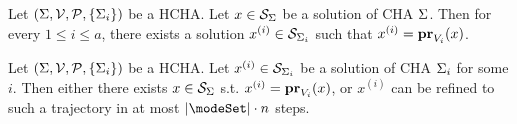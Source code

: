 \begin{thm}
	Let $(\Sys,\Vc,\Pc,\{\Sys_i\})$ be a HCHA.
	Let $x \in \Sc_\Sys$ be a solution of CHA $\Sys$.
	Then for every $1 \leq i \leq a$, 
	there exists a solution $x^{(i)} \in \Sc_{\Sys_i}$ such that $x^{(i)} = \proj{x}{V_i}$.	
\end{thm}




\begin{thm}
	Let $(\Sys,\Vc,\Pc,\{\Sys_i\})$ be a HCHA.
	Let $x^{(i)} \in \Sc_{\Sys_i}$ be a solution of CHA $\Sys_i$ for some $i$.
	Then either there exists $x \in \Sc_\Sys$ s.t. $x^{(i)} = \proj{x}{V_i}$,
	or $x^{(i)}$ can be refined to such a trajectory in at most $|\modeSet|\cdot n$ steps.
\end{thm}